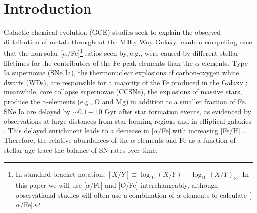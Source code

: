 \documentclass[twocolumn,twocolappendix,linenumbers]{aastex631}
\newcommand{\aFe}{[$\alpha$/Fe]\xspace}
\begin{document}
\section{Introduction}

Galactic chemical evolution (GCE) studies seek to explain the observed distribution of metals throughout the Milky Way Galaxy. \citet{Tinsley1979-StellarLifetimes} made a compelling case that the non-solar \aFe\footnote{
    In standard bracket notation, $[X/Y]\equiv \log_{10}(X/Y) - \log_{10}(X/Y)_{\odot}$. In this paper we will use \aFe and [O/Fe] interchangeably, although observational studies will often use a combination of $\alpha$-elements to calculate \aFe.
} ratios seen by, e.g., \citet{Wallerstein1962-GDwarfAbundances} were caused by different stellar lifetimes for the contributors of the Fe-peak elements than the $\alpha$-elements. 
Type Ia supernovae (SNe Ia), the thermonuclear explosions of carbon-oxygen white dwarfs (WDs), are responsible for a majority of the Fe produced in the Galaxy \citep{Matteucci1986-SupernovaEnrichment}; meanwhile, core collapse supernovae (CCSNe), the explosions of massive stars, produce the $\alpha$-elements (e.g., O and Mg) in addition to a smaller fraction of Fe.
SNe Ia are delayed by $\sim0.1-10$ Gyr after star formation events, as evidenced by observations at large distances from star-forming regions and in elliptical galaxies \citep[e.g.,][]{Maza1976-SNStatistics}.
This delayed enrichment leads to a decrease in \aFe with increasing [Fe/H] \citep{Matteucci1986-SupernovaEnrichment}.
Therefore, the relative abundances of the $\alpha$-elements and Fe as a function of stellar age trace the balance of SN rates over time.
\end{document}
